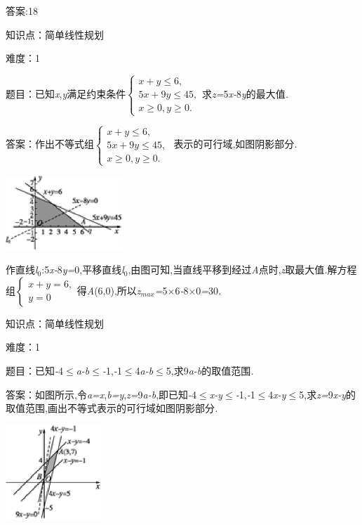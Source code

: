 \documentclass{article} %
\begin{document}
 答案:18

知识点：简单线性规划

难度：1

题目：已知\textit{x},\textit{y}满足约束条件$
\begin{cases}
x+y\le 6,\\
5x+9y \le 45,\\
x\ge 0,y\ge 0.
\end{cases}$求\textit{z=}5\textit{x-}8\textit{y}的最大值\textit{.}

 答案：作出不等式组$
\begin{cases}
x+y\le 6,\\
5x+9y \le 45,\\
x\ge 0,y\ge 0.
\end{cases}$
表示的可行域,如图阴影部分\textit{.}

 \includegraphics*[width=1.74in, height=1.10in, keepaspectratio=false]{image1621}

作直线\textit{l}${}_{0}$:5\textit{x-}8\textit{y=}0,平移直线\textit{l}${}_{0}$,由图可知,当直线平移到经过\textit{A}点时,\textit{z}取最大值\textit{.}解方程组$
\begin{cases}
x+y=6,\\
y=0
\end{cases}$得\textit{A}(6,0),所以\textit{z}${}_{max}$\textit{=}5\textit{$\times$}6\textit{-}8\textit{$\times$}0\textit{=}30\textit{.}

知识点：简单线性规划

难度：1

 题目：已知\textit{-}4$\mathrm{\le}$\textit{a-b}$\mathrm{\le}$\textit{-}1,\textit{-}1$\mathrm{\le}$4\textit{a-b}$\mathrm{\le}$5,求9\textit{a-b}的取值范围\textit{.}

 答案：如图所示,令\textit{a=x},\textit{b=y},\textit{z=}9\textit{a-b},即已知\textit{-}4$\mathrm{\le}$\textit{x-y}$\mathrm{\le}$\textit{-}1,\textit{-}1$\mathrm{\le}$4\textit{x-y}$\mathrm{\le}$5,求\textit{z=}9\textit{x-y}的取值范围,画出不等式表示的可行域如图阴影部分\textit{.}

 \includegraphics*[width=1.43in, height=1.40in, keepaspectratio=false]{image1624}
\end{document}
